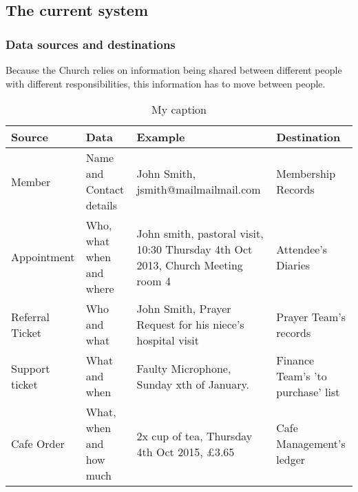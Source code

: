 \subsection{The current system}

\subsubsection{Data sources and destinations}
Because the Church relies on information being shared between different people with different responsibilities, this information has to move between people.

\begin{table}[]
\centering
\caption{My caption}
\label{my-label}
\begin{tabular}{llll}
\hline
\multicolumn{1}{|l|}{Source}             & \multicolumn{1}{l|}{Data}                     & \multicolumn{1}{l|}{Example}                                                                         & \multicolumn{1}{l|}{Destination}                       \\ \hline
\multicolumn{1}{|l|}{Member}             & \multicolumn{1}{l|}{Name and Contact details} & \multicolumn{1}{l|}{John Smith, jsmith@mailmailmail.com}                                             & \multicolumn{1}{l|}{Membership Records}                \\ \hline
\multicolumn{1}{|l|}{Appointment}        & \multicolumn{1}{l|}{Who, what when and where} & \multicolumn{1}{l|}{John smith, pastoral visit, 10:30 Thursday  4th Oct 2013, Church Meeting room 4} & \multicolumn{1}{l|}{Attendee's Diaries}                \\ \hline
\multicolumn{1}{|l|}{Referral Ticket}    & \multicolumn{1}{l|}{Who and what}             & \multicolumn{1}{l|}{John Smith, Prayer Request for his niece's hospital visit}                       & \multicolumn{1}{l|}{Prayer Team's records}             \\ \hline
\multicolumn{1}{|l|}{Support ticket}     & \multicolumn{1}{l|}{What and when}            & \multicolumn{1}{l|}{Faulty Microphone, Sunday xth of January.}                                       & \multicolumn{1}{l|}{Finance Team's 'to purchase' list} \\ \hline
\multicolumn{1}{|l|}{Cafe Order}         & \multicolumn{1}{l|}{What, when and how much}  & \multicolumn{1}{l|}{2x cup of tea, Thursday 4th Oct 2015, £3.65}                                     & \multicolumn{1}{l|}{Cafe Management's ledger}          \\ \hline

\end{tabular}
\end{table}
